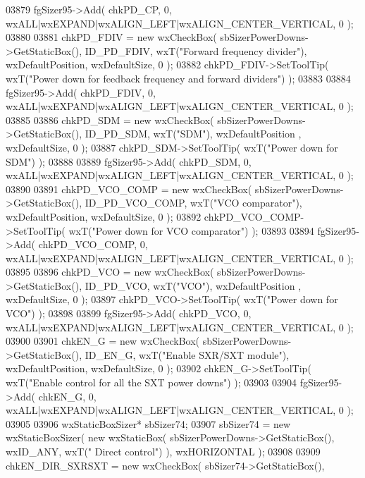 \begin{DoxyCode}
03879     fgSizer95->Add( chkPD_CP, 0, wxALL|wxEXPAND|wxALIGN\_LEFT|wxALIGN\_CENTER\_VERTICAL, 0 );
03880     
03881     chkPD_FDIV = \textcolor{keyword}{new} wxCheckBox( sbSizerPowerDowns->GetStaticBox(), ID_PD_FDIV, wxT(\textcolor{stringliteral}{"Forward frequency
       divider"}), wxDefaultPosition, wxDefaultSize, 0 );
03882     chkPD_FDIV->SetToolTip( wxT(\textcolor{stringliteral}{"Power down for feedback frequency and forward dividers"}) );
03883     
03884     fgSizer95->Add( chkPD_FDIV, 0, wxALL|wxEXPAND|wxALIGN\_LEFT|wxALIGN\_CENTER\_VERTICAL, 0 );
03885     
03886     chkPD_SDM = \textcolor{keyword}{new} wxCheckBox( sbSizerPowerDowns->GetStaticBox(), ID_PD_SDM, wxT(\textcolor{stringliteral}{"SDM"}), wxDefaultPosition
      , wxDefaultSize, 0 );
03887     chkPD_SDM->SetToolTip( wxT(\textcolor{stringliteral}{"Power down for SDM"}) );
03888     
03889     fgSizer95->Add( chkPD_SDM, 0, wxALL|wxEXPAND|wxALIGN\_LEFT|wxALIGN\_CENTER\_VERTICAL, 0 );
03890     
03891     chkPD_VCO_COMP = \textcolor{keyword}{new} wxCheckBox( sbSizerPowerDowns->GetStaticBox(), 
      ID_PD_VCO_COMP, wxT(\textcolor{stringliteral}{"VCO comparator"}), wxDefaultPosition, wxDefaultSize, 0 );
03892     chkPD_VCO_COMP->SetToolTip( wxT(\textcolor{stringliteral}{"Power down for VCO comparator"}) );
03893     
03894     fgSizer95->Add( chkPD_VCO_COMP, 0, wxALL|wxEXPAND|wxALIGN\_LEFT|wxALIGN\_CENTER\_VERTICAL, 0 );
03895     
03896     chkPD_VCO = \textcolor{keyword}{new} wxCheckBox( sbSizerPowerDowns->GetStaticBox(), ID_PD_VCO, wxT(\textcolor{stringliteral}{"VCO"}), wxDefaultPosition
      , wxDefaultSize, 0 );
03897     chkPD_VCO->SetToolTip( wxT(\textcolor{stringliteral}{"Power down for VCO"}) );
03898     
03899     fgSizer95->Add( chkPD_VCO, 0, wxALL|wxEXPAND|wxALIGN\_LEFT|wxALIGN\_CENTER\_VERTICAL, 0 );
03900     
03901     chkEN_G = \textcolor{keyword}{new} wxCheckBox( sbSizerPowerDowns->GetStaticBox(), ID_EN_G, wxT(\textcolor{stringliteral}{"Enable SXR/SXT module"}), 
      wxDefaultPosition, wxDefaultSize, 0 );
03902     chkEN_G->SetToolTip( wxT(\textcolor{stringliteral}{"Enable control for all the SXT power downs"}) );
03903     
03904     fgSizer95->Add( chkEN_G, 0, wxALL|wxEXPAND|wxALIGN\_LEFT|wxALIGN\_CENTER\_VERTICAL, 0 );
03905     
03906     wxStaticBoxSizer* sbSizer74;
03907     sbSizer74 = \textcolor{keyword}{new} wxStaticBoxSizer( \textcolor{keyword}{new} wxStaticBox( sbSizerPowerDowns->GetStaticBox(), wxID\_ANY, wxT(\textcolor{stringliteral}{"
      Direct control"}) ), wxHORIZONTAL );
03908     
03909     chkEN_DIR_SXRSXT = \textcolor{keyword}{new} wxCheckBox( sbSizer74->GetStaticBox(), 

\end{DoxyCode}
